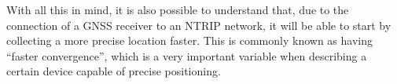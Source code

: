 With all this in mind, it is also possible to understand that, due to the connection of a GNSS receiver to an NTRIP network, it will be able to start by collecting a more precise location faster. This is commonly known as having ``faster convergence'', which is a very important variable when describing a certain device capable of precise positioning.





